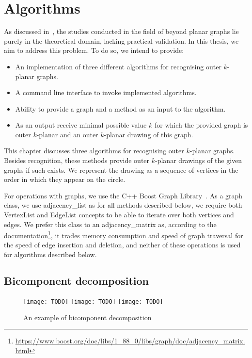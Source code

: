 \chapter{Algorithms}\label{ch:proposed-solution}

As discussed in~, the studies conducted in the field of beyond planar graphs lie purely in the theoretical domain, lacking practical validation. In this thesis, we aim to address this problem. To do so, we intend to provide:
\begin{itemize}
    \item An implementation of three different algorithms for recognising outer \(k\)-planar graphs.
    \item A command line interface to invoke implemented algorithms.
    \item Ability to provide a graph and a method as an input to the algorithm.
    \item As an output receive minimal possible value \(k\) for which the provided graph is outer \(k\)-planar and an outer \(k\)-planar drawing of this graph.
\end{itemize}

This chapter discusses three algorithms for recognising outer \(k\)-planar graphs. Besides recognition, these methods provide outer \(k\)-planar drawings of the given graphs if such exists. We represent the drawing as a sequence of vertices in the order in which they appear on the circle.

For operations with graphs, we use the C++ Boost Graph Library~\cite{boost}. As a graph class, we use \textsf{adjacency\_list} as for all methods described below, we require both \textsf{VertexList} and \textsf{EdgeList} concepts to be able to iterate over both vertices and edges. We prefer this class to an \textsf{adjacency\_matrix} as, according to the documentation\footnote{\url{https://www.boost.org/doc/libs/1_88_0/libs/graph/doc/adjacency_matrix.html}}, it trades memory consumption and speed of graph traversal for the speed of edge insertion and deletion, and neither of these operations is used for algorithms described below.


\section{Bicomponent decomposition}

\begin{figure}[tbh]
    \centering
     {
        \texttt{[image: TODO]}
    }
    \hfill
     {
        \texttt{[image: TODO]}
    }
    \hfill
    \hfill
     {
        \texttt{[image: TODO]}
    }
    \caption{An example of bicomponent decomposition}
\end{figure}

